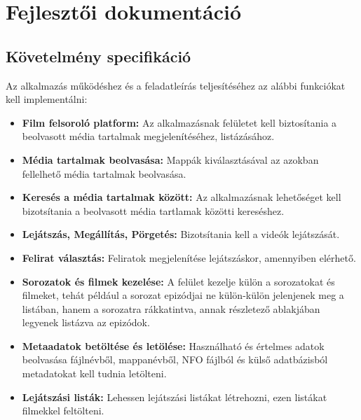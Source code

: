 \chapter{Fejlesztői dokumentáció} %
\label{ch:impl}

\section{Követelmény specifikáció}
Az alkalmazás működéshez és a feladatleírás teljesítéséhez az alábbi funkciókat kell implementálni:
\begin{itemize}
    \item {\textbf {Film felsoroló platform: }} Az alkalmazásnak felületet kell biztosítania a beolvasott média tartalmak megjelenítéséhez, listázásához.
    \item {\textbf {Média tartalmak beolvasása: }} Mappák kiválasztásával az azokban fellelhető média tartalmak beolvasása.
	\item {\textbf {Keresés a média tartalmak között: }} Az alkalmazásnak lehetőséget kell bizotsítania a beolvasott média tartlamak közötti kereséshez.
	\item {\textbf {Lejátszás, Megállítás, Pörgetés: }} Bizotsítania kell a videók lejátszását.
	\item {\textbf {Felirat választás: }} Feliratok megjelenítése lejátszáskor, amennyiben elérhető.
	\item {\textbf {Sorozatok és filmek kezelése: }} A felület kezelje külön a sorozatokat és filmeket, tehát például a sorozat epizódjai ne külön-külön jelenjenek meg a listában, hanem a sorozatra rákkatintva, annak részletező ablakjában legyenek listázva az epizódok.
	\item {\textbf {Metaadatok betöltése és letölése: }} Használható és értelmes adatok beolvasása fájlnévből, mappanévből, NFO fájlból és külső adatbázisból metadatokat kell tudnia letölteni.
    \item {\textbf {Lejátszási listák: }} Lehessen lejátszási listákat létrehozni, ezen listákat filmekkel feltölteni.
\end{itemize}

